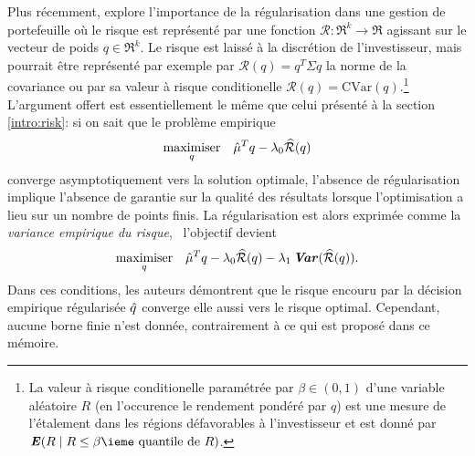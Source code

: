 Plus récemment, \cite{ban2016machine} explore l'importance de la régularisation dans une
gestion de portefeuille où le risque est représenté par une fonction
$\mathcal{R}:\Re^k \to \Re$ agissant sur le vecteur de poids $q \in \Re^k$. Le risque est laissé à
la discrétion de l'investisseur, mais pourrait être représenté par exemple par
$\mathcal{R}(q) = q^T\Sigma q$ la norme de la covariance ou par sa valeur à risque
conditionelle $\mathcal{R}(q) = \mathrm{CVar}(q)$.\footnote{La valeur à risque
  conditionelle paramétrée par $\beta\in(0,1)$ d'une variable aléatoire $R$ (en l'occurence le
  rendement pondéré par $q$) est une mesure de l'étalement dans les régions défavorables à
  l'investisseur et est donné par $\E (R \mid R \leq \text{$\beta$\ieme quantile de
    $R$})$.} L'argument offert est essentiellement le même que celui présenté à la section
\ref{intro:risk}: si on sait que le problème empirique
\begin{equation}
  \maximizeEquation[q]{\hat \mu^Tq - \lambda_0\widehat{\mathcal{R}}(q)}
\end{equation}
converge asymptotiquement vers la solution optimale, l'absence de régularisation implique
l'absence de garantie sur la qualité des résultats lorsque l'optimisation a lieu sur un
nombre de points finis. La régularisation est alors exprimée comme la \textit{variance
  empirique du risque}, \ie\ l'objectif devient
\begin{equation}
  \maximizeEquation[q]{\hat \mu^Tq - \lambda_0\widehat{\mathcal{R}}(q) - \lambda_1\Var(\widehat{\mathcal{R}}(q)).}
\end{equation}
Dans ces conditions, les auteurs démontrent que le risque encouru par la décision
empirique régularisée $\qh$ converge elle aussi vers le risque optimal. Cependant, aucune
borne finie n'est donnée, contrairement à ce qui est proposé dans ce mémoire.

